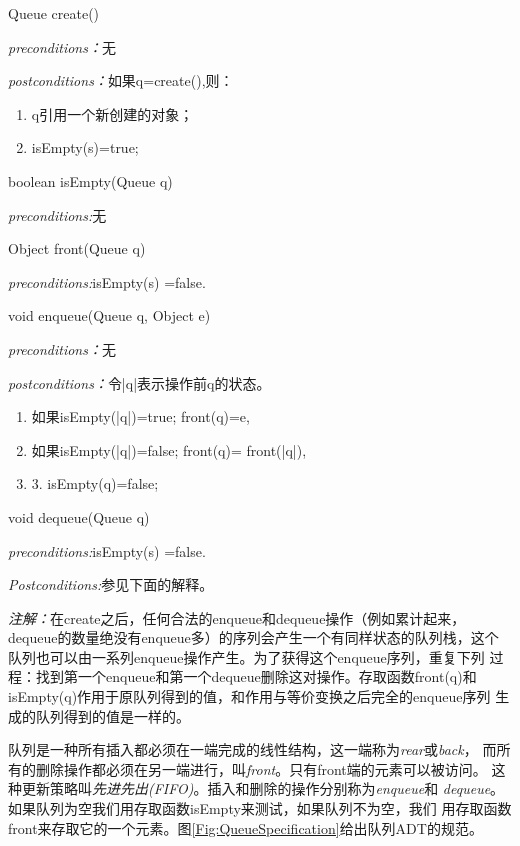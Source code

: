 \begin{figure*}[!t]
\colorbox[rgb]{0.9, 0.9, 0.9}{Queue create()}

\emph{preconditions：}无

\emph{postconditions：}如果q=create(),则：
\begin{enumerate}
\item q引用一个新创建的对象；
\item isEmpty(s)=true;
\end{enumerate}

\colorbox[rgb]{0.9, 0.9, 0.9}{boolean isEmpty(Queue q)}

\emph{preconditions:}无

\colorbox[rgb]{0.9, 0.9, 0.9}{Object front(Queue q)}

\emph{preconditions:}isEmpty(s) =false.

\colorbox[rgb]{0.9, 0.9, 0.9}{void enqueue(Queue q, Object e)}

\emph{preconditions：}无

\emph{postconditions：}令|q|表示操作前q的状态。
\begin{enumerate}
\item 如果isEmpty(|q|)=true; front(q)=e,
\item 如果isEmpty(|q|)=false; front(q)= front(|q|),
\item 3.  isEmpty(q)=false;
\end{enumerate}

\colorbox[rgb]{0.9, 0.9, 0.9}{void dequeue(Queue q)}

\emph{preconditions:}isEmpty(s) =false.

\emph{Postconditions:}参见下面的解释。

\emph{注解：}在create之后，任何合法的enqueue和dequeue操作（例如累计起来，
dequeue的数量绝没有enqueue多）的序列会产生一个有同样状态的队列栈，这个
队列也可以由一系列enqueue操作产生。为了获得这个enqueue序列，重复下列
过程：找到第一个enqueue和第一个dequeue删除这对操作。存取函数front(q)和
isEmpty(q)作用于原队列得到的值，和作用与等价变换之后完全的enqueue序列
生成的队列得到的值是一样的。

    \caption{队列ADT的规范。构造函数是create；isEmpty和front是存取函数；
            enqueue和dequeue是处理函数。类中比\textbf{Object}一般的节点的规范以类似的方法定义。}
    \label{Fig:QueueSpecification}
\end{figure*}

队列是一种所有插入都必须在一端完成的线性结构，这一端称为\emph{rear}或\emph{back}，
而所有的删除操作都必须在另一端进行，叫\emph{front}。只有front端的元素可以被访问。
这种更新策略叫\emph{先进先出(FIFO)}。插入和删除的操作分别称为\emph{enqueue}和
\emph{dequeue}。如果队列为空我们用存取函数isEmpty来测试，如果队列不为空，我们
用存取函数front来存取它的一个元素。图\ref{Fig:QueueSpecification}给出队列ADT的规范。


